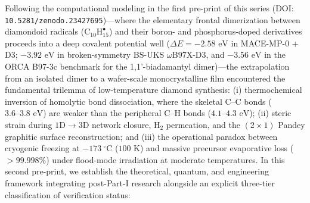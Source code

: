 \documentclass[10pt,twocolumn,a4paper]{article}
\begin{document}
\begin{@twocolumnfalse}
    {\footnotesize\linespread{1.02}\selectfont\setlength{\parskip}{0.25em}
    Following the computational modeling in the first pre-print of this series (DOI: \texttt{10.5281/zenodo.23427695})---where the elementary frontal dimerization between diamondoid radicals ($\text{C}_{10}\text{H}_{15}^\bullet$) and their boron- and phosphorus-doped derivatives proceeds into a deep covalent potential well ($\Delta E = -2.58\text{ eV}$ in MACE-MP-0 + D3; $-3.92\text{ eV}$ in broken-symmetry BS-UKS $\omega\text{B97X-D3}$, and $-3.56\text{ eV}$ in the ORCA B97-3c benchmark for the 1,1'-biadamantyl dimer)---the extrapolation from an isolated dimer to a wafer-scale monocrystalline film encountered the fundamental trilemma of low-temperature diamond synthesis: (i) thermochemical inversion of homolytic bond dissociation, where the skeletal $\text{C--C}$ bonds ($3.6\text{--}3.8\text{ eV}$) are weaker than the peripheral $\text{C--H}$ bonds ($4.1\text{--}4.3\text{ eV}$); (ii) steric strain during $1\text{D} \to 3\text{D}$ network closure, $\text{H}_2$ permeation, and the $(2\times 1)$ Pandey graphitic surface reconstruction; and (iii) the operational paradox between cryogenic freezing at $-173\ ^\circ\text{C}$ ($100\text{ K}$) and massive precursor evaporative loss ($>99.998\%$) under flood-mode irradiation at moderate temperatures. In this second pre-print, we establish the theoretical, quantum, and engineering framework integrating post-Part-I research alongside an explicit three-tier classification of verification status:

}
\end{@twocolumnfalse}
\end{document}
